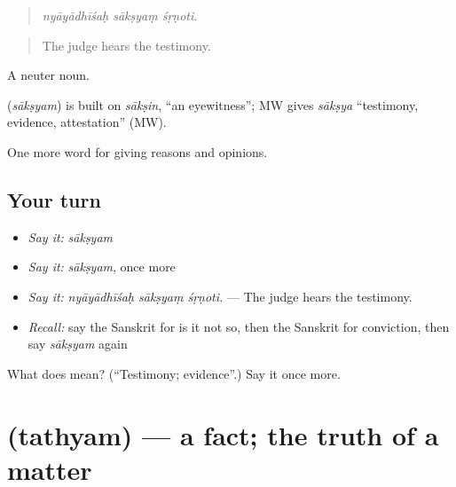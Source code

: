 \begin{quote}
  
\end{quote}

\begin{quote}
\emph{nyāyādhīśaḥ sākṣyaṃ śṛṇoti.}
\end{quote}

\begin{quote}
The judge hears the testimony.
\end{quote}

A neuter noun.

\begin{cousinweb}
\textbf{} (\emph{sākṣyam}) is built on \emph{sākṣin}, \textquotedblleft{}an eyewitness\textquotedblright{}; MW gives \emph{sākṣya} \textquotedblleft{}testimony, evidence, attestation\textquotedblright{} (MW).
\end{cousinweb}

\begin{grammarlens}[title={What you've built}]
One more word for giving reasons and opinions.
\end{grammarlens}

\subsection*{Your turn}
\begin{itemize}
\raggedright
  \item \emph{Say it:} \emph{sākṣyam}
  \item \emph{Say it:} \emph{sākṣyam}, once more
  \item \emph{Say it:} \emph{nyāyādhīśaḥ sākṣyaṃ śṛṇoti.} — The judge hears the testimony.
  \item \emph{Recall:} say the Sanskrit for is it not so, then the Sanskrit for conviction, then say \emph{sākṣyam} again
\end{itemize}

\begin{tcolorbox}[breakable,colback=teal!4,colframe=teal!35!black,title={Before you move on}]
What does  mean? (\textquotedblleft{}Testimony; evidence\textquotedblright{}.) Say it once more.
\end{tcolorbox}
\section[\texorpdfstring{\sk{तथ्यम्} (tathyam)}{तथ्यम् (tathyam)}]{ (tathyam) — a fact; the truth of a matter}

